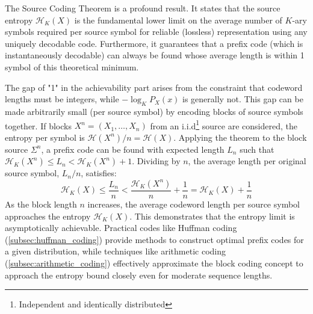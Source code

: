\noindent The Source Coding Theorem is a profound result. It states that the source entropy $\mathcal{H}_K(X)$ is the fundamental lower limit on the average number of $K$-ary symbols required per source symbol for reliable (lossless) representation using any uniquely decodable code. Furthermore, it guarantees that a prefix code (which is instantaneously decodable) can always be found whose average length is within 1 symbol of this theoretical minimum.

\noindent The gap of "1" in the achievability part arises from the constraint that codeword lengths must be integers, while $-\log_K P_X(x)$ is generally not. This gap can be made arbitrarily small (per source symbol) by encoding blocks of source symbols together. If blocks $X^n = (X_1, \ldots, X_n)$ from an i.i.d\footnote{Independent and identically distributed} source are considered, the entropy per symbol is $\mathcal{H}(X^n)/n = \mathcal{H}(X)$. Applying the theorem to the block source $\Sigma^n$, a prefix code can be found with expected length $L_n$ such that $\mathcal{H}_K(X^n) \le L_n < \mathcal{H}_K(X^n) + 1$. Dividing by $n$, the average length per original source symbol, $L_n/n$, satisfies:
\begin{equation*}
    \mathcal{H}_K(X) \le \frac{L_n}{n} < \frac{\mathcal{H}_K(X^n)}{n} + \frac{1}{n} = \mathcal{H}_K(X) + \frac{1}{n}
\end{equation*}
As the block length $n$ increases, the average codeword length per source symbol approaches the entropy $\mathcal{H}_K(X)$. This demonstrates that the entropy limit is asymptotically achievable. Practical codes like Huffman coding (\autoref{subsec:huffman_coding}) provide methods to construct optimal prefix codes for a given distribution, while techniques like arithmetic coding (\autoref{subsec:arithmetic_coding}) effectively approximate the block coding concept to approach the entropy bound closely even for moderate sequence lengths.
